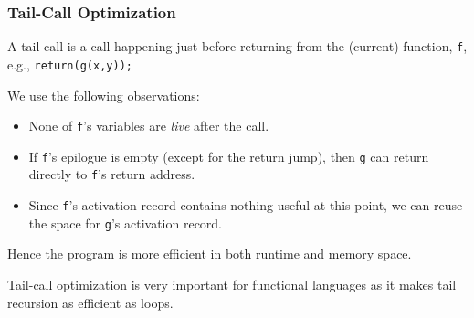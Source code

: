 \documentclass{beamer}
\begin{document}
\begin{frame}
\frametitle{Tail-Call Optimization}


A tail call is a call happening just before returning from the (current) function, {\tt f},
e.g., {\tt return(g(x,y));}\smallskip

We use the following observations:\smallskip

\begin{itemize}
\item None of {\tt f}'s variables are {\em live} after the call.\smallskip

\item If {\tt f}'s epilogue is empty (except for the return jump), then 
{\tt g} can return directly to {\tt f}'s return address.\smallskip

\item Since {\tt f}'s activation record contains nothing useful at this point,
we can reuse the space for {\tt g}'s activation record.

\end{itemize}

\bigskip

Hence the program is more efficient in both runtime and memory space.\smallskip

Tail-call optimization is very important for functional languages as it
makes tail recursion as efficient as loops.

\end{frame}
\end{document}
